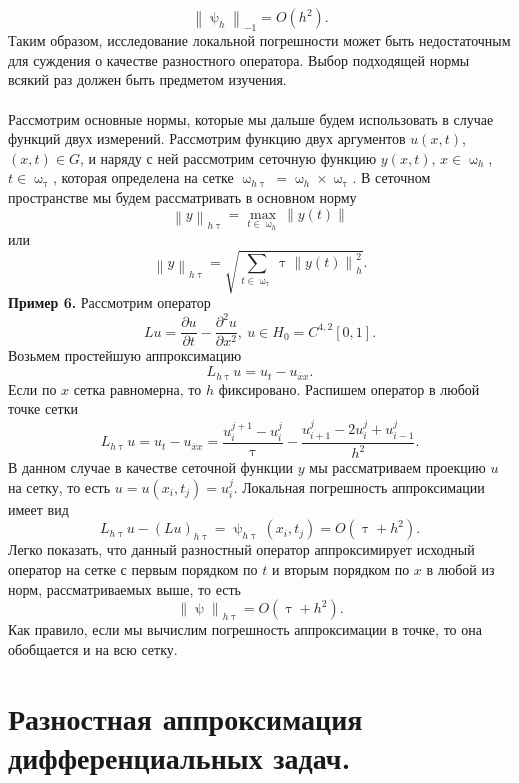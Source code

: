 \documentclass[a4paper, 12pt]{report}
\numberwithin{equation}{section}
\newcommand{\ol}{\overline}
\renewcommand{\tau}{\uptau}
\renewcommand{\psi}{\uppsi}
\renewcommand{\omega}{\upomega}
\renewcommand{\d}{\partial}
\newcommand\Norm[1]{\left\| #1 \right\|}
\begin{document}
$$\Norm{\psi_h}_{-1} = O(h^2).$$
Таким образом, исследование локальной погрешности может быть недостаточным для суждения о качестве разностного оператора.
Выбор подходящей нормы всякий раз должен быть предметом изучения. \\\\
Рассмотрим основные нормы, которые мы дальше будем использовать в случае функций двух измерений. Рассмотрим функцию двух аргументов $u(x,t)$, $(x,t) \in G$, и наряду с ней рассмотрим сеточную функцию $y(x,t)$, $x \in \omega_h$, $t \in \omega_\tau$, которая определена на сетке $\omega_{h\tau} = \omega_h \times \omega_\tau$. В сеточном пространстве мы будем рассматривать в основном норму 
$$\Norm{y}_{h\tau} = \underset{t \in \omega_h}{\max}\Norm{y(t)}$$
или 
$$\Norm{y}_{h\tau} = \sqrt{\sum_{t \in \omega_\tau}\tau \Norm{y(t)}_h^2}.$$
\textbf{Пример 6.}
Рассмотрим оператор $$Lu = \dfrac{\d u}{\d t} - \dfrac{\d ^2 u}{\d x ^2},\ u \in H_0 = C^{4,2}[0,1].$$
Возьмем простейшую аппроксимацию
$$L_{h\tau}u = u_t - u_{\ol xx}.$$
Если по $x$ сетка равномерна, то $h$ фиксировано. Распишем оператор в любой точке сетки
$$L_{h\tau}u = u_t - u_{\ol xx} = \dfrac{u_i^{j+1} - u_i^j}{\tau} - \dfrac{u_{i+1}^j - 2u_i^j + u_{i-1}^j}{h^2}.$$
В данном случае в качестве сеточной функции $y$ мы рассматриваем проекцию $u$ на сетку, то есть $u=u(x_i, t_j) = u_i^j$.
Локальная погрешность аппроксимации имеет вид $$L_{h\tau}u - (Lu)_{h\tau} = \psi_{h\tau}(x_i, t_j) = O(\tau + h^2).$$
Легко показать, что данный разностный оператор аппроксимирует исходный оператор на сетке с первым порядком по $t$ и вторым порядком по $x$ в любой из норм, рассматриваемых выше, то есть 
$$\Norm{\psi}_{h\tau} = O(\tau + h^2).$$
Как правило, если мы вычислим погрешность аппроксимации в точке, то она обобщается и на всю сетку.
\section{Разностная аппроксимация дифференциальных задач.}
\end{document}
